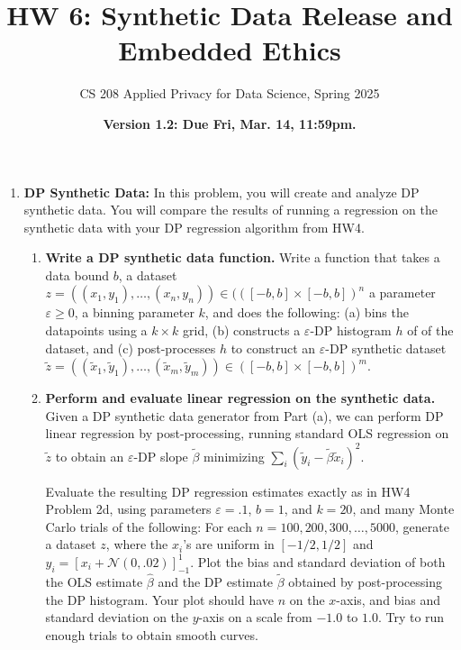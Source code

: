 \documentclass[11pt]{article}
\title{\vspace{-1.5cm} HW 6: Synthetic Data Release and Embedded Ethics}
\author{CS 208 Applied Privacy for Data Science, Spring 2025}
\date{\textbf{Version 1.2: Due Fri, Mar. 14, 11:59pm.}}
\begin{document}
\maketitle

\instructions

\begin{enumerate}[leftmargin=*] 

\item \textbf{DP Synthetic Data:}
        In this problem, you will create and analyze DP synthetic data.
        You will compare the results of running a regression on the synthetic data with your DP regression algorithm from HW4.

        \begin{enumerate}
            \item \textbf{Write a DP synthetic data function.}
            Write a function that takes a data bound $b$, a dataset $z=((x_1,y_1),\ldots,(x_n,y_n))\in (([-b,b]\times [-b,b])^n$
            a parameter $\varepsilon\geq 0$, a binning parameter $k$, and
            does the following:
            (a) bins the datapoints using a $k\times k$ grid, (b) constructs a $\varepsilon$-DP histogram $h$ of of the dataset, and (c) post-processes $h$ to construct an $\varepsilon$-DP synthetic dataset $\tilde{z} = ((\tilde{x}_1,\tilde{y}_1),\ldots,(\tilde{x}_m,\tilde{y}_m))
            \in ([-b,b]\times [-b,b])^m$.  
            \label{part:histogram}
            \item \textbf{Perform and evaluate linear regression on the synthetic data.} 
            Given a
            DP synthetic data generator from Part (a), we can
            perform DP linear regression by post-processing, running
            standard OLS regression on $\tilde{z}$ to 
            obtain an $\varepsilon$-DP slope $\tilde{\beta}$ minimizing 
            $\sum_i (\tilde{y}_i-\tilde{\beta}\tilde{x}_i)^2$.

        Evaluate the resulting DP regression estimates exactly as in HW4                Problem 2d, using parameters $\varepsilon=.1$, $b=1$, and $k=20$, and              many Monte Carlo trials of the following:
           For each $n=100,200,300,\ldots,5000$, 
            generate a dataset $z$, where the 
            $x_i$'s are uniform in $[-1/2,1/2]$ and 
            $y_i = \left[x_i + \mathcal{N}(0,.02)\right]_{-1}^{1}.$
            Plot the bias and standard deviation of both the OLS estimate $\hat{\beta}$ and the DP estimate $\tilde{\beta}$ obtained by
            post-processing the DP histogram.  
            Your plot should have $n$ on the $x$-axis, and bias and standard deviation on the $y$-axis on a scale from $-1.0$ to $1.0$.
            Try to run enough trials to obtain smooth curves.


\end{enumerate}
\end{enumerate}
\end{document}
